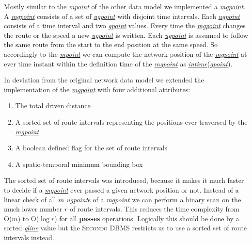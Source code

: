 \documentclass[a4paper]{article}
\newcommand{\secondo}{\textsc{Secondo}}
\newcommand{\op}[1]{\textbf{#1}}
\newcommand{\dt}[1]{\textsl{\underline{#1}}}
\begin{document}
{Mostly similar to the \dt{mpoint} of the other data model we implemented a
\dt{mgpoint}. A \dt{mgpoint} consists of a set of \dt{ugpoint} with disjoint
time intervals. Each \dt{ugpoint} consists of a time interval and two \dt{gpoint}
values. Every time the \dt{mgpoint} changes the route or the speed a new
\dt{ugpoint} is written. Each \dt{ugpoint} is assumed to follow the same route
from the start to the end position at the same speed. So accordingly to the
\dt{mpoint} we can compute the network position of the \dt{mgpoint} at ever time
instant within the definition time of the \dt{mgpoint} as \dt{intime}(\dt{gpoint}).

In deviation from the original network data model we extended the implementation
of the \dt{mgpoint} with four additional attributes:
\begin{enumerate}
	\item The total driven distance
	\item A sorted set of route intervals representing the positions ever
traversed by the \dt{mgpoint}
	\item A boolean defined flag for the set of route intervals
	\item A spatio-temporal minimum bounding box
\end{enumerate}
The sorted set of route intervals was introduced, because it makes it much
faster to decide if a \dt{mgpoint} ever passed a given network position or not.
Instead of a linear check of all $m$ \dt{ugpoint}s of a \dt{mgpoint} we can
perform a binary scan on the much lower number $r$ of route intervals. This reduces
the time complexity from O($m$) to O($\log r$) for all \op{passes}
operations. Logically this should be done by a sorted \dt{gline} value but the
\secondo{} DBMS restricts us to use a sorted set of route intervals instead.

}
\end{document}
